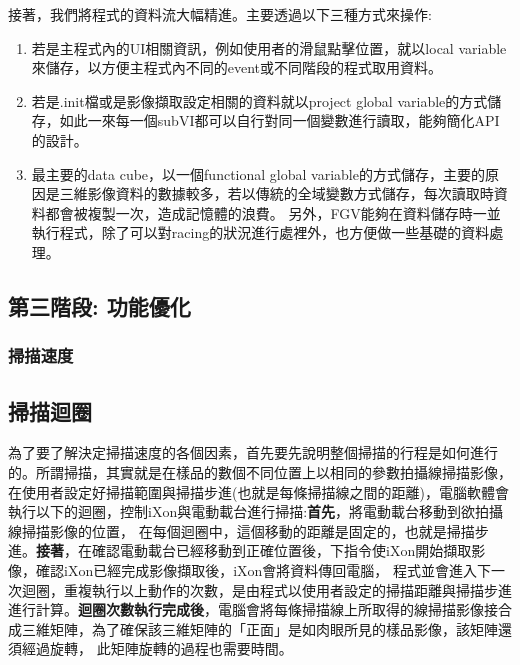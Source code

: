 \documentclass[12pt]{article}
\begin{document}
    接著，我們將程式的資料流大幅精進。主要透過以下三種方式來操作:
    \begin{enumerate}
        \item 若是主程式內的UI相關資訊，例如使用者的滑鼠點擊位置，就以local variable來儲存，以方便主程式內不同的event或不同階段的程式取用資料。
        \item 若是.init檔或是影像擷取設定相關的資料就以project global variable的方式儲存，如此一來每一個subVI都可以自行對同一個變數進行讀取，能夠簡化API的設計。
        \item 最主要的data cube，以一個functional global variable的方式儲存，主要的原因是三維影像資料的數據較多，若以傳統的全域變數方式儲存，每次讀取時資料都會被複製一次，造成記憶體的浪費。
        另外，FGV能夠在資料儲存時一並執行程式，除了可以對racing的狀況進行處裡外，也方便做一些基礎的資料處理。
    \end{enumerate}

    \subsection{第三階段: 功能優化}
    
    \subsubsection{掃描速度}
    \subsection{掃描迴圈}
    為了要了解決定掃描速度的各個因素，首先要先說明整個掃描的行程是如何進行的。所謂掃描，其實就是在樣品的數個不同位置上以相同的參數拍攝線掃描影像，
    在使用者設定好掃描範圍與掃描步進(也就是每條掃描線之間的距離)，電腦軟體會執行以下的迴圈，控制iXon與電動載台進行掃描:\textbf{首先}，將電動載台移動到欲拍攝線掃描影像的位置，
    在每個迴圈中，這個移動的距離是固定的，也就是掃描步進。\textbf{接著}，在確認電動載台已經移動到正確位置後，下指令使iXon開始擷取影像，確認iXon已經完成影像擷取後，iXon會將資料傳回電腦，
    程式並會進入下一次迴圈，重複執行以上動作的次數，是由程式以使用者設定的掃描距離與掃描步進進行計算。\textbf{迴圈次數執行完成後}，電腦會將每條掃描線上所取得的線掃描影像接合成三維矩陣，為了確保該三維矩陣的「正面」是如肉眼所見的樣品影像，該矩陣還須經過旋轉，
    此矩陣旋轉的過程也需要時間。
\end{document}

